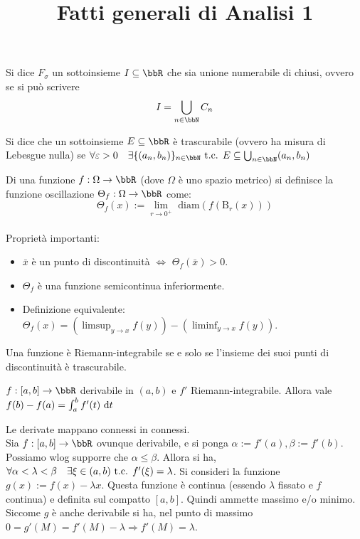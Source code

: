 \documentclass[a4paper,NoNotes,GeneralMath]{stdmdoc}
\newcommand{\B}{\mbox{B}}
\newcommand{\diam}{\mbox{ diam}}
\begin{document}
\title{Fatti generali di Analisi 1}

 Si dice $F_\sigma$ un sottoinsieme $I \subseteq \bbR$ che sia unione numerabile di chiusi, ovvero se si può scrivere $$I = \bigcup_{n\in\bbN} C_n$$

 Si dice che un sottoinsieme $E \subseteq \bbR$ è trascurabile (ovvero ha misura di Lebesgue nulla) se $\forall \varepsilon > 0 \quad \exists \{(a_n, b_n)\}_{n\in\bbN} \tc E \subseteq \bigcup_{n\in\bbN} (a_n, b_n)$

 Di una funzione $f: \Omega \rightarrow \bbR$ (dove $\Omega$ è uno spazio metrico) si definisce la funzione oscillazione $\Theta_{f}: \Omega \rightarrow \bbR$ come: $$\Theta_{f}(x) := \lim_{r \rightarrow 0^{+}} \diam (f(\B_r(x)))$$ \\
Proprietà importanti: \begin{itemize}
	\item $\bar{x}$ è un punto di discontinuità $\Leftrightarrow$ $\Theta_f(\bar{x}) > 0$.
	\item $\Theta_f$ è una funzione semicontinua inferiormente.
	\item Definizione equivalente: $\Theta_f(x) = \left( \limsup_{y \rightarrow x} f(y) \right) - \left( \liminf_{y \rightarrow x} f(y) \right)$.
\end{itemize}

 Una funzione è Riemann-integrabile se e solo se l'insieme dei suoi punti di discontinuità è trascurabile.

 $f: [a, b] \rightarrow \bbR$ derivabile in $(a,b)$ e $f'$ Riemann-integrabile. Allora vale $f(b) - f(a) = \int_{a}^{b} f'(t) \de t$

 Le derivate mappano connessi in connessi. \\
Sia $f: [a,b] \rightarrow \bbR$ ovunque derivabile, e si ponga $\alpha := f'(a), \beta := f'(b)$. Possiamo wlog supporre che $\alpha \le \beta$. Allora si ha, $\forall \alpha < \lambda < \beta \quad \exists \xi \in (a, b) \mbox{ t.c. } f'(\xi) = \lambda$.
\Dimostrazione Si consideri la funzione $g(x) := f(x) - \lambda x$. Questa funzione è continua (essendo $\lambda$ fissato e $f$ continua) e definita sul compatto $[a,b]$. Quindi ammette massimo e/o minimo. Siccome $g$ è anche derivabile si ha, nel punto di massimo $0 = g'(M) = f'(M) - \lambda \Rightarrow f'(M) = \lambda$.
\end{document}
